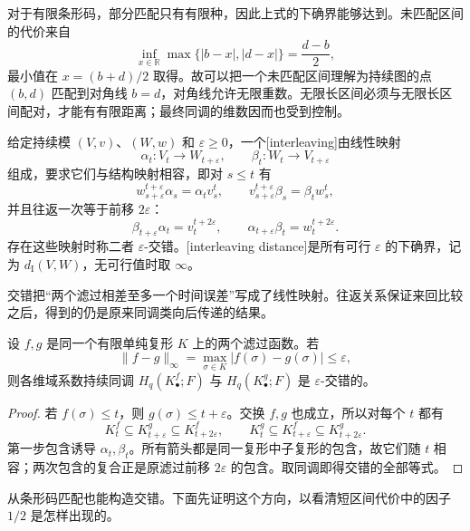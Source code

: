 对于有限条形码，部分匹配只有有限种，因此上式的下确界能够达到。未匹配区间的代价来自
\[
	\inf_{x\in\mathbb R}\max\{|b-x|,|d-x|\}=\frac{d-b}{2},
\]
最小值在 \(x=(b+d)/2\) 取得。故可以把一个未匹配区间理解为持续图的点 \((b,d)\) 匹配到对角线 \(b=d\)，对角线允许无限重数。无限长区间必须与无限长区间配对，才能有有限距离；最终同调的维数因而也受到控制。

\begin{definition}\label{g2:def:persistence-interleaving}
	给定持续模 \((V,v)\)、\((W,w)\) 和 \(\varepsilon\geq0\)，一个[interleaving]由线性映射
	\[
		\alpha_t:V_t\longrightarrow W_{t+\varepsilon},\qquad
		\beta_t:W_t\longrightarrow V_{t+\varepsilon}
	\]
	组成，要求它们与结构映射相容，即对 \(s\leq t\) 有
	\[
		w_{s+\varepsilon}^{t+\varepsilon}\alpha_s=\alpha_t v_s^t,
		\qquad v_{s+\varepsilon}^{t+\varepsilon}\beta_s=\beta_t w_s^t,
	\]
	并且往返一次等于前移 \(2\varepsilon\)：
	\[
		\beta_{t+\varepsilon}\alpha_t=v_t^{t+2\varepsilon},\qquad
		\alpha_{t+\varepsilon}\beta_t=w_t^{t+2\varepsilon}.
	\]
	存在这些映射时称二者 \(\varepsilon\)-交错。[interleaving distance]是所有可行 \(\varepsilon\) 的下确界，记为 \(d_{\mathrm I}(V,W)\)，无可行值时取 \(\infty\)。
\end{definition}

交错把“两个滤过相差至多一个时间误差”写成了线性映射。往返关系保证来回比较之后，得到的仍是原来同调类向后传递的结果。

\begin{proposition}\label{g2:prop:filtration-sup-interleaving}
	设 \(f,g\) 是同一个有限单纯复形 \(K\) 上的两个滤过函数。若
	\[
		\|f-g\|_\infty=\max_{\sigma\in K}|f(\sigma)-g(\sigma)|\leq\varepsilon,
	\]
	则各维域系数持续同调 \(H_q(K^f_\bullet;F)\) 与 \(H_q(K^g_\bullet;F)\) 是 \(\varepsilon\)-交错的。
\end{proposition}

\begin{proof}
	若 \(f(\sigma)\leq t\)，则 \(g(\sigma)\leq t+\varepsilon\)。交换 \(f,g\) 也成立，所以对每个 \(t\) 都有
	\[
		K^f_t\subseteq K^g_{t+\varepsilon}\subseteq K^f_{t+2\varepsilon},\qquad
		K^g_t\subseteq K^f_{t+\varepsilon}\subseteq K^g_{t+2\varepsilon}.
	\]
	第一步包含诱导 \(\alpha_t,\beta_t\)。所有箭头都是同一复形中子复形的包含，故它们随 \(t\) 相容；两次包含的复合正是原滤过前移 \(2\varepsilon\) 的包含。取同调即得交错的全部等式。
\end{proof}

从条形码匹配也能构造交错。下面先证明这个方向，以看清短区间代价中的因子 \(1/2\) 是怎样出现的。

